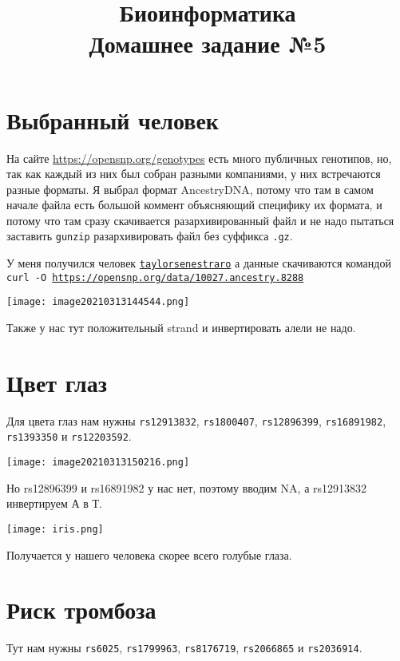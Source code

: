 \documentclass{article}
\title{Биоинформатика \\ Домашнее задание №5}
\begin{document}
  \maketitle

  \section{Выбранный человек} %
  На сайте \url{https://opensnp.org/genotypes} есть много публичных генотипов,
  но, так как каждый из них был собран разными компаниями, у них встречаются разные форматы.
  Я выбрал формат AncestryDNA, потому что %
  там в самом начале файла есть большой коммент объясняющий специфику их формата,
  и потому что там сразу скачивается разархивированный файл
  и не надо пытаться заставить \texttt{gunzip} разархивировать файл без суффикса \texttt{.gz}.

  У меня получился человек \href{https://opensnp.org/users/10027}{\texttt{taylorsenestraro}} а данные скачиваются командой
  \texttt{curl -O \url{https://opensnp.org/data/10027.ancestry.8288}}

  \noindent
  \texttt{[image: image20210313144544.png]}

  Также у нас тут положительный strand и инвертировать алели не надо.

  \section{Цвет глаз}
  Для цвета глаз нам нужны
  \texttt{rs12913832}, \texttt{rs1800407}, \texttt{rs12896399}, \texttt{rs16891982}, \texttt{rs1393350} и \texttt{rs12203592}.

  \noindent
  \texttt{[image: image20210313150216.png]}

  Но rs12896399 и rs16891982 у нас нет, поэтому вводим NA, а rs12913832 инвертируем А в Т.

  \noindent
  \texttt{[image: iris.png]}

  Получается у нашего человека скорее всего голубые глаза.

  \section{Риск тромбоза}
  Тут нам нужны \texttt{rs6025}, \texttt{rs1799963}, \texttt{rs8176719}, \texttt{rs2066865} и \texttt{rs2036914}.
\end{document}
